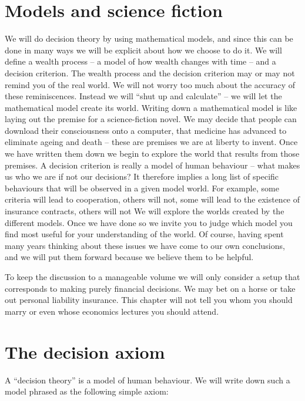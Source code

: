 \section{Models and science fiction}
We will do decision theory 
by using mathematical models, and since this can be done in many ways we will be
explicit about how we choose to do it. We will define a wealth process -- a model of how wealth changes with time -- 
and a decision criterion. The wealth process and the decision criterion may or may not remind you
of the real world. We will not worry too much about the accuracy 
of these reminiscences. Instead we will ``shut up and calculate'' -- we will let the mathematical
model create its world. Writing down a mathematical model is like laying out the premise for
a science-fiction novel. We may decide that people can download their consciousness onto a computer, 
that medicine has advanced to eliminate ageing and death -- these are premises we are at liberty to invent.
Once we have written them down we begin to explore the world that results from those premises.
A decision criterion is really a model of human behaviour -- what makes us who we are if not our decisions? 
It therefore implies a long list of specific behaviours that will
be observed in a given model world. For example, some criteria will lead to cooperation, others will not, some will lead
to the existence of insurance contracts, others will not \etc We will explore the worlds created by the different
models. Once we have done so we invite you to judge which model you find most useful
for your understanding of the world. Of course, having spent many years thinking about these
issues we have come to our own conclusions, and we will put them forward because we believe them to be helpful.

To keep the discussion to a manageable volume we will only consider a setup that corresponds to
making purely financial decisions. We may bet on a horse or take out personal liability insurance.
This chapter will not tell you whom you should marry or even whose economics lectures you should attend.


\section{The decision axiom}

A ``decision theory'' is a model of human behaviour. We will write down such a model phrased as the following simple 
axiom: 

